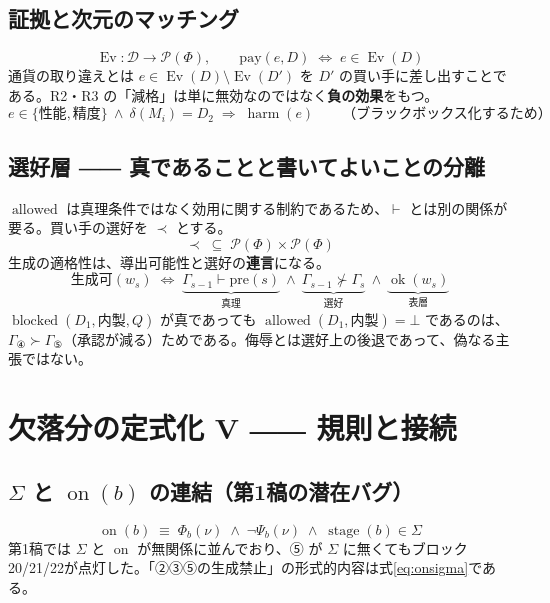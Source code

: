 \documentclass[11pt,a4paper]{article}
\newcommand{\blocked}{\operatorname{blocked}}
\newcommand{\allowed}{\operatorname{allowed}}
\newcommand{\ok}{\operatorname{ok}}
\newcommand{\on}{\operatorname{on}}
\newcommand{\stg}{\operatorname{stage}}
\newcommand{\Ev}{\operatorname{Ev}}
\newcommand{\harm}{\operatorname{harm}}
\begin{document}
\subsection{証拠と次元のマッチング}
\[
\Ev : \mathcal{D} \to \mathcal{P}(\Phi), \qquad
\text{pay}(e, D) \;\Longleftrightarrow\; e \in \Ev(D)
\]
通貨の取り違えとは $e \in \Ev(D) \setminus \Ev(D')$ を $D'$ の買い手に差し出すことである。R2・R3 の「減格」は単に無効なのではなく\textbf{負の効果}をもつ。
\begin{equation}
e \in \{\text{性能},\text{精度}\} \ \wedge\ \delta(M_i) = D_2 \;\Longrightarrow\; \harm(e)
\qquad\text{（ブラックボックス化するため）}
\end{equation}

\subsection{選好層 ―― 真であることと書いてよいことの分離}

$\allowed$ は真理条件ではなく効用に関する制約であるため、$\vdash$ とは別の関係が要る。買い手の選好を $\prec$ とする。
\begin{equation}\label{eq:pref}
\prec \;\subseteq\; \mathcal{P}(\Phi) \times \mathcal{P}(\Phi)
\end{equation}
生成の適格性は、導出可能性と選好の\textbf{連言}になる。
\begin{equation}\label{eq:gen}
\boxed{\;
\text{生成可}(w_s) \;\Longleftrightarrow\;
\underbrace{\Gamma_{s-1} \vdash \mathrm{pre}(s)}_{\text{真理}}
\ \wedge\
\underbrace{\Gamma_{s-1} \not\succ \Gamma_s}_{\text{選好}}
\ \wedge\
\underbrace{\ok(w_s)}_{\text{表層}}
\;}
\end{equation}
$\blocked(D_1, \text{内製}, Q)$ が真であっても $\allowed(D_1,\text{内製}) = \bot$ であるのは、$\Gamma_{④} \succ \Gamma_{⑤}$（承認が減る）ためである。侮辱とは選好上の後退であって、偽なる主張ではない。

\section{欠落分の定式化 V ―― 規則と接続}

\subsection{$\Sigma$ と $\on(b)$ の連結（第1稿の潜在バグ）}
\begin{equation}\label{eq:onsigma}
\boxed{\;\on(b) \;\equiv\; \Phi_b(\nu) \;\wedge\; \neg\Psi_b(\nu) \;\wedge\; \stg(b) \in \Sigma \;}
\end{equation}
第1稿では $\Sigma$ と $\on$ が無関係に並んでおり、⑤ が $\Sigma$ に無くてもブロック20/21/22が点灯した。「②③⑤の生成禁止」の形式的内容は式\eqref{eq:onsigma}である。
\end{document}
